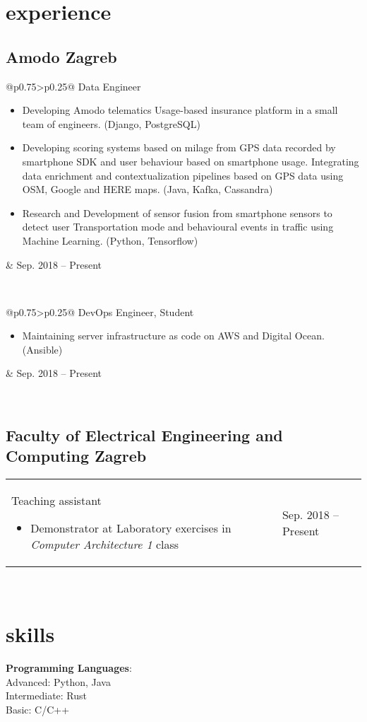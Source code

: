 \documentclass[a4paper]{article}
\makeatletter
\newlength{\tablewidth}
\newenvironment{period}[2]{%
\newcommand{\sarma}{#2}%
\setlength{\tablewidth}{\linewidth}
\addtolength{\tablewidth}{-2\tabcolsep}
\begin{tabular}{@{}p{0.75\tablewidth}>{\raggedleft\arraybackslash}p{0.25\tablewidth}@{}}%
#1 \newline
\begin{itemize}
}{%
\end{itemize} & \sarma \\%
\end{tabular}\\
}
\makeatother
\begin{document}
\section{experience}
\subsection{Amodo \hspace*{\fill}Zagreb}
\begin{period}{Data Engineer}{Sep. 2018 -- Present}
    \item Developing Amodo telematics Usage-based insurance platform in a small team of engineers.
    (Django, PostgreSQL)
    \item Developing scoring systems based on milage from GPS data recorded by smartphone SDK
    and user behaviour based on smartphone usage. Integrating data enrichment and contextualization
    pipelines based on GPS data using OSM, Google and HERE maps. (Java, Kafka, Cassandra)
    \item Research and Development of sensor fusion from smartphone sensors to detect user Transportation
    mode and behavioural events in traffic using Machine Learning. (Python, Tensorflow) 
     
\end{period}


\begin{period}{DevOps Engineer, Student}{Jul. 2017 -- Sep. 2018}
    \item Maintaining server infrastructure as code on AWS and Digital Ocean. (Ansible)
\end{period}


\subsection{Faculty of Electrical Engineering and Computing \hspace*{\fill}Zagreb}
\begin{period}{Teaching assistant}{Jan. 2015 -- May. 2015}
    \item Demonstrator at Laboratory exercises in \textit{Computer Architecture 1} class
\end{period}


\section{skills}
\textbf{Programming Languages}:\\
Advanced: Python, Java\\
Intermediate: Rust\\
Basic: C/C++\\
\end{document}
